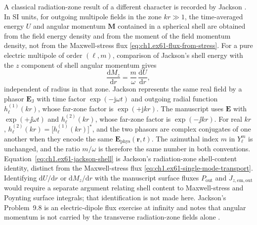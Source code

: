 A classical radiation-zone result of a different character is recorded by Jackson \cite{jackson1999}. In SI units, for outgoing multipole fields in the zone $kr\gg 1$, the time-averaged energy $U$ and angular momentum $\mathbf M$ contained in a spherical shell are obtained from the field energy density and from the moment of the field momentum density, not from the Maxwell-stress flux \eqref{eq:ch1.ex61-flux-from-stress}. For a pure electric multipole of order $(\ell,m)$, comparison of Jackson's shell energy \cite[Eq.~(9.136)]{jackson1999} with the $z$ component of shell angular momentum \cite[Eqs.~(9.143)--(9.144)]{jackson1999} gives
\begin{equation}
\label{eq:ch1.ex61-jackson-shell}
\frac{\mathrm{d}M_z}{\mathrm{d}r}=\frac{m}{\omega}\,\frac{\mathrm{d}U}{\mathrm{d}r},
\end{equation}
independent of radius in that zone. Jackson represents the same real field by a phasor $\mathbf E_{\mathrm{J}}$ with time factor $\exp(-\mathrm{j}\omega t)$ and outgoing radial function $h_\ell^{(1)}(kr)$, whose far-zone factor is $\exp(+\mathrm{j}kr)$. The manuscript uses $\mathbf E$ with $\exp(+\jj\omega t)$ and $h_\ell^{(2)}(kr)$, whose far-zone factor is $\exp(-\jj kr)$. For real $kr$, $h_\ell^{(2)}(kr)=\bigl[h_\ell^{(1)}(kr)\bigr]^*$, and the two phasors are complex conjugates of one another when they encode the same $\mathbf E_{\mathrm{phys}}(\mathbf r,t)$. The azimuthal index $m$ in $Y_\ell^m$ is unchanged, and the ratio $m/\omega$ is therefore the same number in both conventions. Equation~\eqref{eq:ch1.ex61-jackson-shell} is Jackson's radiation-zone shell-content identity, distinct from the Maxwell-stress flux \eqref{eq:ch1.ex61-single-mode-transport}. Identifying $\mathrm{d}U/\mathrm{d}r$ or $\mathrm{d}M_z/\mathrm{d}r$ with the manuscript surface fluxes $P_{\mathrm{out}}$ and $\dot J_{z,\mathrm{em,out}}$ would require a separate argument relating shell content to Maxwell-stress and Poynting surface integrals; that identification is not made here. Jackson's Problem~9.8 is an electric-dipole flux exercise at infinity and notes that angular momentum is not carried by the transverse radiation-zone fields alone \cite{jackson1999}.

